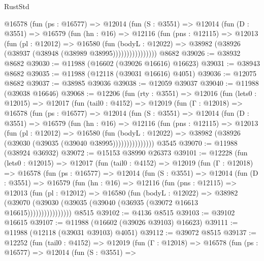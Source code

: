 \begin{lexlean}{RustStd}
\begin{coremodule}
            @16578
              (fun (ps : @16577) =>
              @12014
                (fun (S : @3551) =>
                @12014
                  (fun (D : @3551) =>
                  @16579
                    (fun (hn : @16) =>
                    @12116
                      (fun (pns : @12115) =>
                      @12013
                        (fun (pl : @12012) =>
                        @16580
                          (fun (bodyL : @12022) =>
                          @38982 (@38926 (@38937 (@38948 (@38989 @38995))))))))))))))))
    @8682
@39026 := @38932 @8682
@39030 := @11988 (@16602 (@39026 @16616) @16623)
@39031 := @38943 @8682
@39035 := @11988 (@12118 (@39031 @16616) @4051)
@39036 := @12075 @8682
@39037 := @38985 @39036
@39038 := @12059 @39037
@39040 := @11988 (@39038 @16646)
@39068 := @12206
    (fun (rty : @3551) =>
    @12016
      (fun (lets0 : @12015) =>
      @12017
        (fun (tail0 : @4152) =>
        @12019
          (fun (Γ : @12018) =>
          @16578
            (fun (ps : @16577) =>
            @12014
              (fun (S : @3551) =>
              @12014
                (fun (D : @3551) =>
                @16579
                  (fun (hn : @16) =>
                  @12116
                    (fun (pns : @12115) =>
                    @12013
                      (fun (pl : @12012) =>
                      @16580
                        (fun (bodyL : @12022) =>
                        @38982 (@38926 (@39030 (@39035 (@39040 @38995)))))))))))))))
    @3545
@39070 := @11988 (@38924 @36932)
@39072 := @15153 @38990 @26373
@39101 := @12228
    (fun (lets0 : @12015) =>
    @12017
      (fun (tail0 : @4152) =>
      @12019
        (fun (Γ : @12018) =>
        @16578
          (fun (ps : @16577) =>
          @12014
            (fun (S : @3551) =>
            @12014
              (fun (D : @3551) =>
              @16579
                (fun (hn : @16) =>
                @12116
                  (fun (pns : @12115) =>
                  @12013
                    (fun (pl : @12012) =>
                    @16580
                      (fun (bodyL : @12022) =>
                      @38982
                        (@39070
                          (@39030 (@39035 (@39040 (@36935 (@39072 @16613 @16615))))))))))))))))
    @8515
@39102 := @4136 @8515
@39103 := @39102 @16615
@39107 := @11988 (@16602 (@39026 @39103) @16623)
@39111 := @11988 (@12118 (@39031 @39103) @4051)
@39112 := @39072 @8515
@39137 := @12252
    (fun (tail0 : @4152) =>
    @12019
      (fun (Γ : @12018) =>
      @16578
        (fun (ps : @16577) =>
        @12014
          (fun (S : @3551) =>

\end{coremodule}
\end{lexlean}

